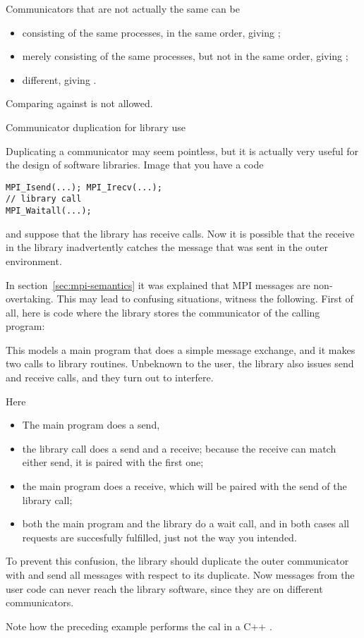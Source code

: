 Communicators that are not actually the same can be
\begin{itemize}
\item consisting of the same processes, in the same order,
  giving ;
\item merely consisting of the same processes, but not in the same order,
  giving ;
\item different, giving .
\end{itemize}

Comparing against  is not allowed.

 {Communicator duplication for library use}

Duplicating a communicator may seem pointless, but it is actually very useful for the design of
software libraries. Image that you have a code
\lstset{style=reviewcode,language=C}
\begin{lstlisting}
MPI_Isend(...); MPI_Irecv(...);
// library call
MPI_Waitall(...);
\end{lstlisting}
and suppose that the library has receive calls. Now it is possible that the 
receive in the library inadvertently
catches the message that was sent in the outer environment.

In section~\ref{sec:mpi-semantics} it was explained that MPI messages are 
non-overtaking. This may lead to confusing situations, witness the following.
First of all, here is code where the library stores the communicator
of the calling program:
%

This models a main program that does a simple message exchange, and it
makes two calls to library routines. Unbeknown to the user, the
library also issues send and receive calls, and they turn out to
interfere.

Here
\begin{itemize}
\item The main program does a send,
\item the library call  does a send and a receive;
  because the receive can match either send, it is paired with the
  first one;
\item the main program does a receive, which will be paired with the send of the 
  library call;
\item both the main program and the library do a wait call, and in
  both cases all requests are succesfully fulfilled, just not the way
  you intended.
\end{itemize}

To prevent this confusion, the library should duplicate the outer
communicator with 
%
and send all messages with respect to its duplicate. Now messages from the user
code can never reach the library software, since they are on different communicators.


Note how the preceding example
performs the 
cal in a C++ .


